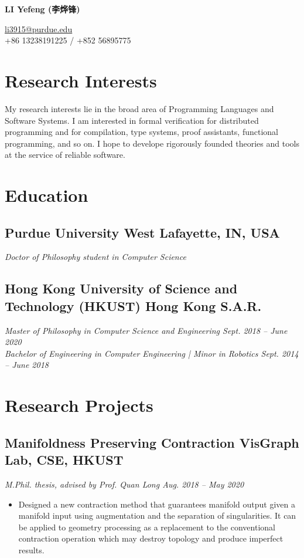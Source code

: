 \documentclass[10pt]{article}
\newcommand{\subsec}[2]{\subsection*{#1 \hfill {\normalfont #2}}}
\newcommand{\subsecdesc}[2]{{\em #1 \hfill #2}}
\begin{document}
\begin{center}
{\bfseries
  \LARGE LI Yefeng
  \Large (李烨锋)
}
\vspace{4pt}

{\small\ttfamily
  \href{mailto:li3915@purdue.edu}{li3915@purdue.edu} \\
  +86 13238191225 / +852 56895775
}
\end{center}

\section*{Research Interests} %

  My research interests lie in the broad area of Programming Languages and Software Systems. I am interested in formal verification for distributed programming and for compilation, type systems, proof assistants, functional programming, and so on. I hope to develope rigorously founded theories and tools at the service of reliable software.

\section*{Education} %

  \subsec{Purdue University}{West Lafayette, IN, USA}
  \subsecdesc{Doctor of Philosophy student in Computer Science}{}

  \subsec{Hong Kong University of Science and Technology (HKUST)}{Hong Kong S.A.R.}
  \subsecdesc{Master of Philosophy in Computer Science and Engineering}{Sept. 2018 -- June 2020} \\
  \subsecdesc{Bachelor of Engineering in Computer Engineering {\normalfont |} Minor in Robotics}{Sept. 2014 -- June 2018}

\section*{Research Projects} %

  \subsec{Manifoldness Preserving Contraction}{VisGraph Lab, CSE, HKUST}
  \subsecdesc{M.Phil. thesis, advised by Prof. Quan Long}{Aug. 2018 -- May 2020}
  \begin{itemize}
    \item Designed a new contraction method that guarantees manifold output given a manifold input using augmentation and the separation of singularities. It can be applied to geometry processing as a replacement to the conventional contraction operation which may destroy topology and produce imperfect results.
  \end{itemize}
\end{document}
